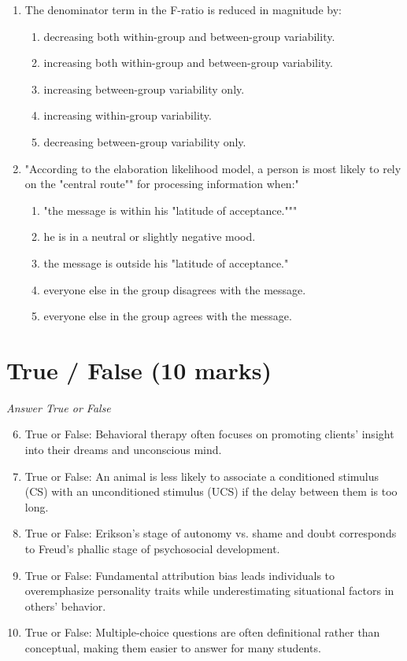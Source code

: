 \documentclass[12pt]{article}
\begin{document}
\begin{enumerate}[label=\arabic*.]
\begin{enumerate}[label=(\alph*)]
    \item High arousal always maximizes motivation.
\end{enumerate}
\item The denominator term in the F-ratio is reduced in magnitude by:
\begin{enumerate}[label=(\alph*)]
    \item decreasing both within-group and between-group variability.
    \item increasing both within-group and between-group variability.
    \item increasing between-group variability only.
    \item increasing within-group variability.
    \item decreasing between-group variability only.
\end{enumerate}
\item "According to the elaboration likelihood model, a person is most likely to rely on the "central route"" for processing information when:"
\begin{enumerate}[label=(\alph*)]
    \item "the message is within his "latitude of acceptance."""
    \item he is in a neutral or slightly negative mood.
    \item the message is outside his "latitude of acceptance."
    \item everyone else in the group disagrees with the message.
    \item everyone else in the group agrees with the message.
\end{enumerate}
\end{enumerate}

\section*{True / False (10 marks)}
\textit{Answer True or False}
\begin{enumerate}[label=\arabic*.]
\setcounter{enumi}{5}
\item True or False: Behavioral therapy often focuses on promoting clients' insight into their dreams and unconscious mind.
\item True or False: An animal is less likely to associate a conditioned stimulus (CS) with an unconditioned stimulus (UCS) if the delay between them is too long.
\item True or False: Erikson's stage of autonomy vs. shame and doubt corresponds to Freud's phallic stage of psychosocial development.
\item True or False: Fundamental attribution bias leads individuals to overemphasize personality traits while underestimating situational factors in others' behavior.
\item True or False: Multiple-choice questions are often definitional rather than conceptual, making them easier to answer for many students.
\end{enumerate}
\end{document}
